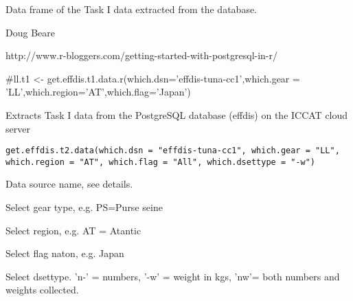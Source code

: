 \documentclass[letterpaper]{book}
\begin{document}
%
\begin{Value}
Data frame of the Task I data extracted from the database.
\end{Value}
%
\begin{Author}\relax
Doug Beare
\end{Author}
%
\begin{References}\relax
http://www.r-bloggers.com/getting-started-with-postgresql-in-r/
\end{References}
%
\begin{Examples}
\begin{ExampleCode}

#ll.t1 <- get.effdis.t1.data.r(which.dsn='effdis-tuna-cc1',which.gear = 'LL',which.region='AT',which.flag='Japan')


\end{ExampleCode}
\end{Examples}
%
\begin{Description}\relax
Extracts Task I data from the PostgreSQL database (effdis) on the ICCAT cloud server
\end{Description}
%
\begin{Usage}
\begin{verbatim}
get.effdis.t2.data(which.dsn = "effdis-tuna-cc1", which.gear = "LL", which.region = "AT", which.flag = "All", which.dsettype = "-w")
\end{verbatim}
\end{Usage}
%
\begin{Arguments}
\begin{ldescription}
\item[\code{which.dsn}] 
Data source name, see details.

\item[\code{which.gear}] 
Select gear type, e.g. PS=Purse seine

\item[\code{which.region}] 
Select region, e.g. AT = Atantic

\item[\code{which.flag}] 
Select flag naton, e.g. Japan

\item[\code{which.dsettype}] 
Select dsettype. 'n-' = numbers, '-w' = weight in kgs, 'nw'= both numbers and weights collected.

\end{ldescription}
\end{Arguments}
\end{document}
